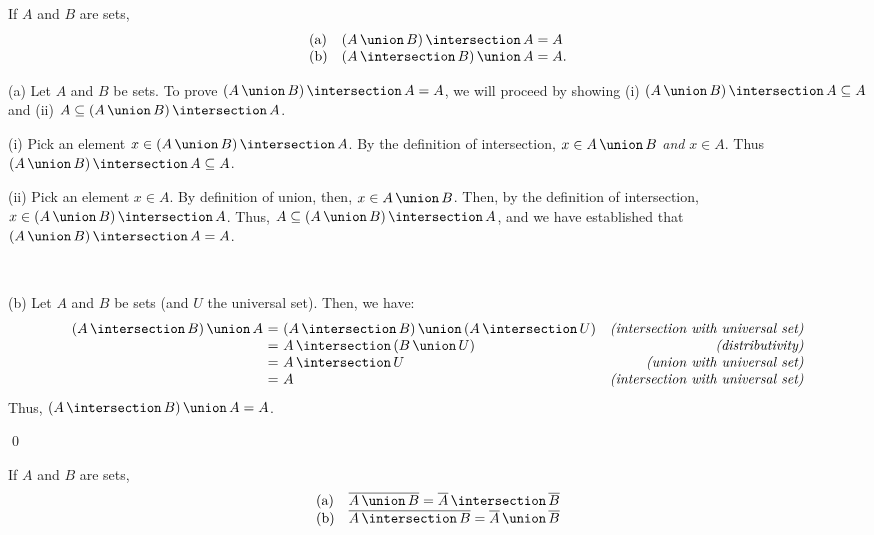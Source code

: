 \begin{thmex}\label{theorem:absorption}
If $A$ and $B$ are sets,
\[\begin{array}{ll}
\textrm{(a)} & \setintersection{(\setunion{A}{B})}{A}= A \\
\textrm{(b)} & \setunion{(\setintersection{A}{B})}{A} = A.
\end{array}\]
\begin{proofex}

(a) Let $A$ and $B$ be sets. To prove $\setintersection{(\setunion{A}{B})}{A}= A$, we will proceed by showing (i) $\setintersection{(\setunion{A}{B})}{A} \subseteq A$ and (ii) $A \subseteq \setintersection{(\setunion{A}{B})}{A}$. 

(i) Pick an element $x \in \setintersection{(\setunion{A}{B})}{A}$. By the definition of intersection, $x \in \setunion A B$ \emph{and} $x \in A$. Thus $\setintersection{(\setunion{A}{B})}{A} \subseteq A$.

(ii) Pick an element $x \in A$. By definition of union, then, $x \in \setunion{A}{B}$. Then, by the definition of intersection, $x \in \setintersection{(\setunion{A}{B})}{A}$. Thus, $A \subseteq \setintersection{(\setunion{A}{B})}{A}$, and we have established that $\setintersection{(\setunion{A}{B})}{A}= A$.

~

\noindent (b) Let $A$ and $B$ be sets (and $U$ the universal set). Then, we have:
\[\begin{array}{r@{\ =\ }lr}
\setunion{(\setintersection{A}{B})}{A} & \setunion{(\setintersection{A}{B})}{(\setintersection{A}{U)}} 
		& \textit{(intersection with universal set)} \\
		& \setintersection{A}{(\setunion{B}{U})} & \textit{(distributivity)} \\
		& \setintersection{A}{U}	& \textit{(union with universal set)} \\
		& A & \textit{(intersection with universal set)} 
\end{array}\]
Thus, $\setunion{(\setintersection{A}{B})}{A} = A$.

\qed
\end{proofex}
\end{thmex}

\begin{thm}\label{theorem:demorgans}
If $A$ and $B$ are sets,
\[\begin{array}{ll} 
\textrm{(a)} &  \setcomplement{\setunion{A}{B}} = \setintersection{\setcomplement{A}}{\setcomplement{B}}
\\
\textrm{(b)} & \setcomplement{\setintersection{A}{B}} = \setunion{\setcomplement{A}}{\setcomplement{B}}
\end{array}\]
\end{thm}

